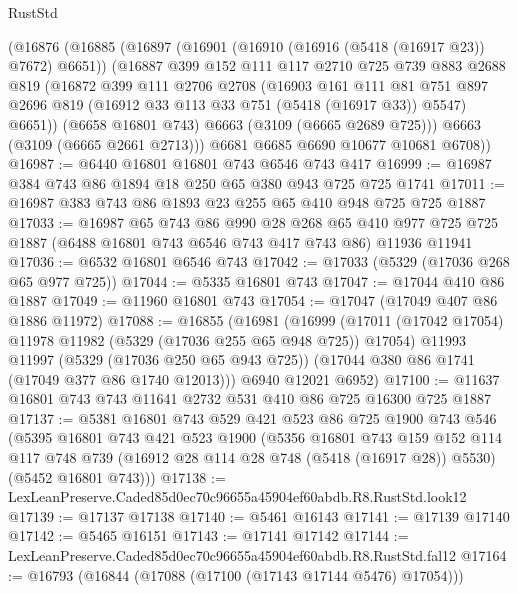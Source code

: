 \begin{lexlean}{RustStd}
\begin{coremodule}
    (@16876
      (@16885
        (@16897
          (@16901 (@16910 (@16916 (@5418 (@16917 @23)) @7672) @6651))
          (@16887
            @399
            @152
            @111
            @117
            @2710
            @725
            @739
            @883
            @2688
            @819
            (@16872
              @399
              @111
              @2706
              @2708
              (@16903
                @161
                @111
                @81
                @751
                @897
                @2696
                @819
                (@16912 @33 @113 @33 @751 (@5418 (@16917 @33)) @5547)
                @6651))
            (@6658 @16801 @743)
            @6663
            (@3109 (@6665 @2689 @725)))
          @6663
          (@3109 (@6665 @2661 @2713)))
        @6681
        @6685
        @6690
        @10677
        @10681
        @6708))
@16987 := @6440 @16801 @16801 @743 @6546 @743 @417
@16999 := @16987 @384 @743 @86 @1894 @18 @250 @65 @380 @943 @725 @725 @1741
@17011 := @16987 @383 @743 @86 @1893 @23 @255 @65 @410 @948 @725 @725 @1887
@17033 := @16987
    @65
    @743
    @86
    @990
    @28
    @268
    @65
    @410
    @977
    @725
    @725
    @1887
    (@6488 @16801 @743 @6546 @743 @417 @743 @86)
    @11936
    @11941
@17036 := @6532 @16801 @6546 @743
@17042 := @17033 (@5329 (@17036 @268 @65 @977 @725))
@17044 := @5335 @16801 @743
@17047 := @17044 @410 @86 @1887
@17049 := @11960 @16801 @743
@17054 := @17047 (@17049 @407 @86 @1886 @11972)
@17088 := @16855
    (@16981
      (@16999
        (@17011 (@17042 @17054) @11978 @11982 (@5329 (@17036 @255 @65 @948 @725)) @17054)
        @11993
        @11997
        (@5329 (@17036 @250 @65 @943 @725))
        (@17044 @380 @86 @1741 (@17049 @377 @86 @1740 @12013)))
      @6940
      @12021
      @6952)
@17100 := @11637 @16801 @743 @743 @11641 @2732 @531 @410 @86 @725 @16300 @725 @1887
@17137 := @5381
    @16801
    @743
    @529
    @421
    @523
    @86
    @725
    @1900
    @743
    @546
    (@5395
      @16801
      @743
      @421
      @523
      @1900
      (@5356
        @16801
        @743
        @159
        @152
        @114
        @117
        @748
        @739
        (@16912 @28 @114 @28 @748 (@5418 (@16917 @28)) @5530)
        (@5452 @16801 @743)))
@17138 := LexLeanPreserve.Caded85d0ec70c96655a45904ef60abdb.R8.RustStd.look12
@17139 := @17137 @17138
@17140 := @5461 @16143
@17141 := @17139 @17140
@17142 := @5465 @16151
@17143 := @17141 @17142
@17144 := LexLeanPreserve.Caded85d0ec70c96655a45904ef60abdb.R8.RustStd.fal12
@17164 := @16793
    (@16844 (@17088 (@17100 (@17143 @17144 @5476) @17054)))

\end{coremodule}
\end{lexlean}
